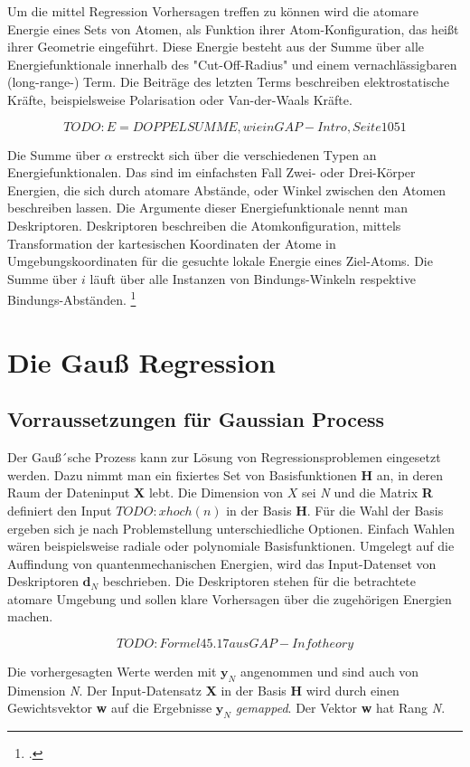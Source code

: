 Um die mittel Regression Vorhersagen treffen zu können wird die atomare Energie eines Sets von Atomen, als Funktion ihrer Atom-Konfiguration, das heißt ihrer Geometrie eingeführt. Diese Energie besteht aus der Summe über alle Energiefunktionale innerhalb des  "Cut-Off-Radius" und einem vernachlässigbaren (long-range-) Term. Die Beiträge des letzten Terms beschreiben elektrostatische Kräfte, beispielsweise Polarisation oder Van-der-Waals Kräfte. 

$$TODO: E=DOPPELSUMME, wie in GAP-Intro, Seite 1051$$

Die Summe über $\alpha$ erstreckt sich über die verschiedenen Typen an Energiefunktionalen. Das sind im einfachsten Fall Zwei- oder Drei-Körper Energien, die sich durch atomare Abstände, oder Winkel zwischen den Atomen beschreiben lassen. Die Argumente dieser Energiefunktionale nennt man Deskriptoren. Deskriptoren beschreiben die Atomkonfiguration, mittels Transformation der kartesischen Koordinaten der Atome in Umgebungskoordinaten für die gesuchte lokale Energie eines Ziel-Atoms. Die Summe über $i$ läuft über alle Instanzen von Bindungs-Winkeln respektive Bindungs-Abständen. \footcite[1051]{GAP-intro}


\section{Die Gauß Regression}

\subsection{Vorraussetzungen für Gaussian Process}

Der Gauß´sche Prozess kann zur Lösung von Regressionsproblemen eingesetzt werden. Dazu nimmt man ein fixiertes Set von Basisfunktionen \textbf{H} an, in deren Raum der Dateninput \textbf{X} lebt. Die Dimension von $X$ sei \textit{N} und die Matrix \textbf{R} definiert den Input $TODO:x hoch (n)$ in der Basis \textbf{H}. Für die Wahl der Basis ergeben sich je nach Problemstellung unterschiedliche Optionen. Einfach Wahlen wären beispielsweise radiale oder polynomiale Basisfunktionen. Umgelegt auf die Auffindung von quantenmechanischen Energien, wird das Input-Datenset von Deskriptoren $\textbf{d}_N$ beschrieben. Die Deskriptoren stehen für die betrachtete atomare Umgebung und sollen klare Vorhersagen über die zugehörigen Energien machen. 

$$TODO: Formel 45.17 aus GAP-Info theory$$

Die vorhergesagten Werte werden mit $\textbf{y}_N$ angenommen und sind auch von Dimension \textit{N}. Der Input-Datensatz \textbf{X} in der Basis \textbf{H} wird durch einen Gewichtsvektor \textbf{w} auf die Ergebnisse $\textbf{y}_N$ \textit{gemapped}. Der Vektor \textbf{w} hat Rang \textit{N}.

